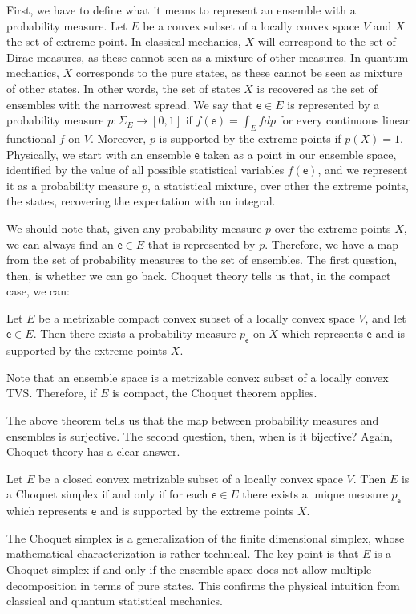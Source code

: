 \documentclass[10pt,twocolumn, nofootinbib]{revtex4-2}
\newcommand{\ens}[1][e] {\mathsf{#1}} %
\begin{document}
First, we have to define what it means to represent an ensemble with a probability measure. Let $E$ be a convex subset of a locally convex space $V$ and $X$ the set of extreme point. In classical mechanics, $X$ will correspond to the set of Dirac measures, as these cannot seen as a mixture of other measures. In quantum mechanics, $X$ corresponds to the pure states, as these cannot be seen as mixture of other states. In other words, the set of states $X$ is recovered as the set of ensembles with the narrowest spread. We say that $\ens \in E$ is represented by a probability measure $p : \Sigma_{E} \to [0,1]$ if $f(\ens) = \int_E f dp$ for every continuous linear functional $f$ on $V$. Moreover, $p$ is supported by the extreme points if $p(X) = 1$. Physically, we start with an ensemble $\ens$ taken as a point in our ensemble space, identified by the value of all possible statistical variables $f(\ens)$, and we represent it as a probability measure $p$, a statistical mixture, over other the extreme points, the states, recovering the expectation with an integral.

We should note that, given any probability measure $p$ over the extreme points $X$, we can always find an $\ens \in E$ that is represented by $p$. Therefore, we have a map from the set of probability measures to the set of ensembles. The first question, then, is whether we can go back. Choquet theory tells us that, in the compact case, we can:
\begin{thrm}[Choquet 1]
	Let $E$ be a metrizable compact convex subset of a locally convex space $V$, and let $\ens \in E$. Then there exists a probability measure $p_{\ens}$ on $X$ which represents $\ens$ and is supported by the extreme points $X$.
\end{thrm}
Note that an ensemble space is a metrizable convex subset of a locally convex TVS. Therefore, if $E$ is compact, the Choquet theorem applies.

The above theorem tells us that the map between probability measures and ensembles is surjective. The second question, then, when is it bijective? Again, Choquet theory has a clear answer.
\begin{thrm}[Choquet 2]
	Let $E$ be a closed convex metrizable subset of a locally convex space $V$. Then $E$ is a Choquet simplex if and only if for each $\ens \in E$ there exists a unique measure $p_{\ens}$ which represents $\ens$ and is supported by the extreme points $X$.
\end{thrm}
The Choquet simplex is a generalization of the finite dimensional simplex, whose mathematical characterization is rather technical. The key point is that $E$ is a Choquet simplex if and only if the ensemble space does not allow multiple decomposition in terms of pure states. This confirms the physical intuition from classical and quantum statistical mechanics.
\end{document}
